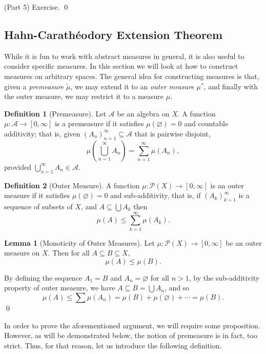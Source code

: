 \documentclass[
]{article}
\theoremstyle{definition}
\theoremstyle{definition}
\newtheorem{definition}{Definition}[section]
\newtheorem{lemma}{Lemma}[section]
\begin{document}
(Part 5) Exercise. \qed

\hypertarget{hahn-carathuxe9odory-extension-theorem}{%
\subsection{Hahn-Carathéodory Extension
Theorem}\label{hahn-carathuxe9odory-extension-theorem}}

While it is fun to work with abstract measures in general, it is also
useful to consider specific measures. In this section we will look at
how to construct measures on arbitrary spaces. The general idea for
constructing measures is that, given a \emph{premeasure}
\(\tilde{\mu}\), we may extend it to an \emph{outer measure} \(\mu^*\),
and finally with the outer measure, we may restrict it to a measure
\(\mu\).

\begin{definition}[Premeasure]
  Let \(\mathcal{A}\) be an algebra on \(X\). A function \(\mu : \mathcal{A} \to [0, \infty]\) 
  is a premeasure if it satisfies \(\mu(\varnothing) = 0\) and countable additivity; 
  that is, given \((A_n)_{n = 1}^\infty \subseteq \mathcal{A}\) that is pairwise disjoint, 
  \[\mu\left(\bigcup_{n = 1}^\infty A_n\right) = \sum_{n = 1}^\infty \mu(A_n),\]
  provided \(\bigcup_{n = 1}^\infty A_n \in \mathcal{A}\).
\end{definition}
\begin{definition}[Outer Measure]
  A function \(\mu : \mathcal{P}(X) \to [0, \infty]\) is an outer measure if it 
  satisfies \(\mu(\varnothing) = 0\) and sub-additivity, that is, 
  if \((A_k)_{k = 1}^\infty\) is a sequence of subsets of \(X\), and 
  \(A \subseteq \bigcup A_k\) then 
  \[\mu(A) \le \sum_{k = 1}^\infty \mu(A_k).\]
\end{definition}

\begin{lemma}[Monoticity of Outer Measures]
  Let \(\mu : \mathcal{P}(X) \to [0, \infty]\) be an outer measure on \(X\). Then 
  for all \(A \subseteq B \subseteq X\), 
  \[\mu(A) \le \mu(B).\]
\end{lemma}
\proof

By defining the sequence \(A_1 = B\) and \(A_n = \varnothing\) for all
\(n > 1\), by the sub-additivity property of outer measure, we have
\(A \subseteq B = \bigcup A_n\), and so
\[\mu(A) \le \sum\mu(A_n) = \mu(B) + \mu(\varnothing) + \cdots = \mu(B).\]
\qed

In order to prove the aforementioned argument, we will require some
proposition. However, as will be demonstrated below, the notion of
premeasure is in fact, too strict. Thus, for that reason, let us
introduce the following definition.
\end{document}
